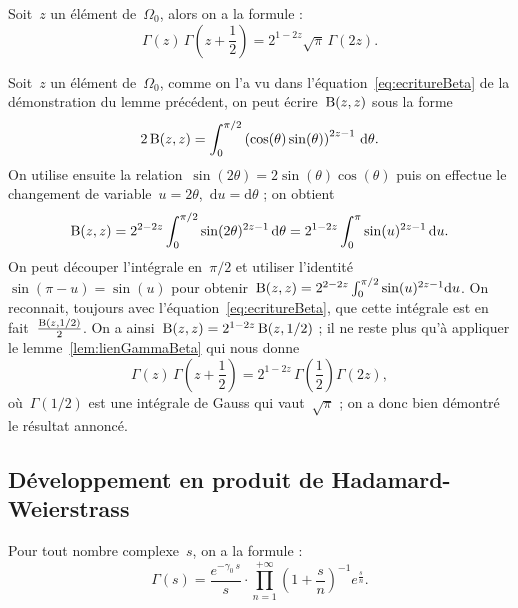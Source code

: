 		\begin{prop}\label{prop:formuleMultiGamma}
		Soit~$z$ un élément de~$\Omega_0$, alors on a la formule :
		\[
			\Gamma(z)\,\Gamma\left(z+\frac{1}{2}\right) = 2^{1-2z}\sqrt{\pi}\,\Gamma(2z).
		\]
		\end{prop}
		\begin{dem}
			Soit~$z$ un élément de~$\Omega_0$, comme on l'a vu dans l'équation~\eqref{eq:ecritureBeta} de la démonstration du lemme précédent, on peut écrire~$\operatorname{B}(z,z)$ sous la forme  
			\[
				2\operatorname{B}(z,z) = \int_{0}^{\pi/2}\left(\cos(\theta)\sin(\theta)\right)^{2z-1}\,\mathrm{d}\theta.
			\]
			On utilise ensuite la relation~$\sin(2\theta)=2\sin(\theta)\cos(\theta)$ puis on effectue le changement de variable~$u=2\theta$,~$\mathrm{d}u=\mathrm{d}\theta$ ; on obtient
			\[
				\operatorname{B}(z,z) = 2^{2-2z}\int_{0}^{\pi/2} \sin(2\theta)^{2z-1}\,\mathrm{d}\theta
						= 2^{1-2z}\int_{0}^{\pi} \sin(u)^{2z-1}\,\mathrm{d}u.
			\]
			On peut découper l'intégrale en~$\pi/2$ et utiliser l'identité~$\sin(\pi-u)=\sin(u)$ pour obtenir~$\operatorname{B}(z,z)=2^{2-2z}\int_0^{\pi/2}\sin(u)^{2z-1}\mathrm{d}u$. On reconnait, toujours avec l'équation~\eqref{eq:ecritureBeta}, que cette intégrale est en fait~$\frac{\operatorname{B}(z,1/2)}{2}$. On a ainsi~$\operatorname{B}(z,z)=2^{1-2z}\operatorname{B}(z,1/2)$ ; il ne reste plus qu'à appliquer le lemme~\ref{lem:lienGammaBeta} qui nous donne
			\[
				\Gamma(z)\,\Gamma\left(z+\frac{1}{2}\right)
							= 2^{1-2z}\,\Gamma\left(\frac{1}{2}\right)\Gamma(2z),
			\]
			où~$\Gamma(1/2)$ est une intégrale de Gauss qui vaut~$\sqrt{\pi}$ ; on a donc bien démontré le résultat annoncé.
		\end{dem}
	\subsection{Développement en produit de Hadamard-Weierstrass}
		\begin{thm}\label{thm:ProdHadamardGamma}
			Pour tout nombre complexe~$s$, on a la formule :
			\[
				\Gamma(s) = \frac{e^{-\gamma_0\, s}}{s}\cdot \prod_{n=1}^{+\infty} 
				\left(1+\frac{s}{n}\right)^{-1}e^{\frac{s}{n}}.
			\]
		\end{thm}
